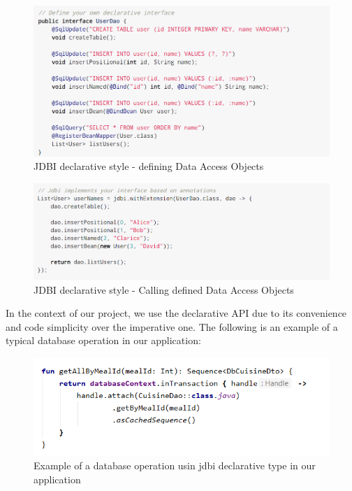 \begin{figure}[H]
    \begin{center}
        \includegraphics[scale=0.5]{_figures/declarative.png}
        \caption{JDBI declarative style - defining Data Access Objects}
    \end{center}
\end{figure}

\begin{figure}[H]
    \begin{center}
        \includegraphics[scale=0.5]{_figures/calling-declarative.png}
        \caption{JDBI declarative style - Calling defined Data Access Objects}
    \end{center}
\end{figure}

In the context of our project, we use the declarative API due to its convenience and code simplicity over the
imperative one. The following is an example of a typical database operation in our application:\

\begin{figure}[H]
    \begin{center}
        \includegraphics[scale=0.8]{_figures/jdbi-nutrio.png}
        \caption{Example of a database operation usin jdbi declarative type in our application}
    \end{center}
\end{figure}

